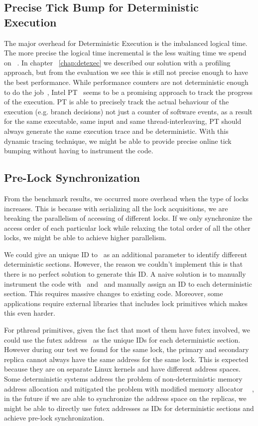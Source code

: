 \subsection{Precise Tick Bump for Deterministic Execution}
The major overhead for Deterministic Execution is the imbalanced logical time. The more precise the logical time incremental is the less waiting time we spend on \detstart\ . In chapter ~\ref{chap:detexec} we described our solution with a profiling approach, but from the evaluation we see this is still not precise enough to have the best performance. While performance counters are not deterministic enough to do the job~\cite{weaver2008can}, Intel PT~\cite{intelpt} seems to be a promising approach to track the progress of the execution. PT is able to precisely track the actual behaviour of the execution (e.g. branch decisions) not just a counter of software events, as a result for the same executable, same input and same thread-interleaving, PT should always generate the same execution trace and be deterministic. With this dynamic tracing technique, we might be able to provide precise online tick bumping without having to instrument the code.
\subsection{Pre-Lock Synchronization}
From the benchmark results, we occurred more overhead when the type of locks increases. This is because with serializing all the lock acquisitions, we are breaking the parallelism of accessing of different locks. If we only synchronize the access order of each particular lock while relaxing the total order of all the other locks, we might be able to achieve higher parallelism.

We could give an unique ID to \detstart\ as an additional parameter to identify different deterministic sections. However, the reason we couldn't implement this is that there is no perfect solution to generate this ID. A naive solution is to manually instrument the code with \detstart\ and \detend\, and manually assign an ID to each deterministic section. This requires massive changes to existing code. Moreover, some applications require external libraries that includes lock primitives which makes this even harder.

For pthread primitives, given the fact that most of them have futex involved, we could use the futex address~\cite{franke2002fuss} as the unique IDs for each deterministic section. However during our test we found for the same lock, the primary and secondary replica cannot always have the same address for the same lock. This is expected because they are on separate Linux kernels and have different address spaces. Some deterministic systems address the problem of non-deterministic memory address allocation and mitigated the problem with modified memory allocator ~\cite{bergan2010deterministic}~\cite{liu2011dthreads}, in the future if we are able to synchronize the address space on the replicas, we might be able to directly use futex addresses as IDs for deterministic sections and achieve pre-lock synchronization. 

